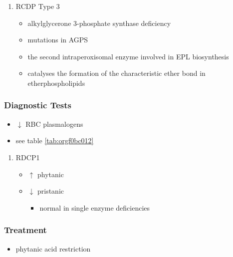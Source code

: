 \documentclass[12pt]{scrartcl}
\begin{document}
\begin{enumerate}
\item RCDP Type 3
\label{sec:org2dc2e66}
\begin{itemize}
\item alkylglycerone 3-phosphate synthase deficiency
\item mutations in AGPS
\item the second intraperoxisomal enzyme involved in EPL biosynthesis
\item catalyses the formation of the characteristic ether bond in etherphospholipids
\end{itemize}
\end{enumerate}

\subsubsection{Diagnostic Tests}
\label{sec:orgdc644e8}
\begin{itemize}
\item \(\downarrow\) RBC plasmalogens
\item see table \ref{tab:orgf0bc012}
\end{itemize}
\begin{enumerate}
\item RDCP1
\label{sec:org4c3a5f0}
\begin{itemize}
\item \(\uparrow\) phytanic
\item \(\downarrow\) pristanic
\begin{itemize}
\item normal in single enzyme deficiencies
\end{itemize}
\end{itemize}
\end{enumerate}

\subsubsection{Treatment}
\label{sec:orgb83f19f}
\begin{itemize}
\item phytanic acid restriction
\end{itemize}
\end{document}

